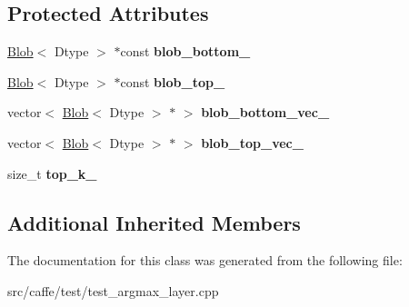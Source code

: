 \subsection*{Protected Attributes}
\begin{DoxyCompactItemize}
\item 
\mbox{\label{classcaffe_1_1_arg_max_layer_test_adbb2354dca0741fde54f1474bbc66710}} 
\mbox{\hyperlink{classcaffe_1_1_blob}{Blob}}$<$ Dtype $>$ $\ast$const {\bfseries blob\+\_\+bottom\+\_\+}
\item 
\mbox{\label{classcaffe_1_1_arg_max_layer_test_a369e4dedfa7fbfa9e9289243a8e4cea7}} 
\mbox{\hyperlink{classcaffe_1_1_blob}{Blob}}$<$ Dtype $>$ $\ast$const {\bfseries blob\+\_\+top\+\_\+}
\item 
\mbox{\label{classcaffe_1_1_arg_max_layer_test_a7412530842242bfc474b12c6635ed785}} 
vector$<$ \mbox{\hyperlink{classcaffe_1_1_blob}{Blob}}$<$ Dtype $>$ $\ast$ $>$ {\bfseries blob\+\_\+bottom\+\_\+vec\+\_\+}
\item 
\mbox{\label{classcaffe_1_1_arg_max_layer_test_a8299747adb971f1b6fb883dbdbb6a9be}} 
vector$<$ \mbox{\hyperlink{classcaffe_1_1_blob}{Blob}}$<$ Dtype $>$ $\ast$ $>$ {\bfseries blob\+\_\+top\+\_\+vec\+\_\+}
\item 
\mbox{\label{classcaffe_1_1_arg_max_layer_test_a3cc74415e6e9809abe98686799003476}} 
size\+\_\+t {\bfseries top\+\_\+k\+\_\+}
\end{DoxyCompactItemize}
\subsection*{Additional Inherited Members}


The documentation for this class was generated from the following file\+:\begin{DoxyCompactItemize}
\item 
src/caffe/test/test\+\_\+argmax\+\_\+layer.\+cpp\end{DoxyCompactItemize}
